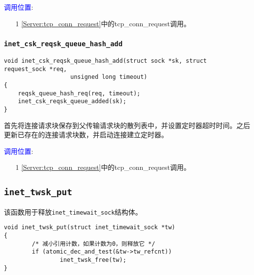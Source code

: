         \textcolor{blue}{调用位置}:

            \begin{enumerate}
                \item[1]        \ref{Server:tcp_conn_request}中的tcp\_conn\_request调用。
            \end{enumerate}

        \subsubsection{\texttt{inet_csk_reqsk_queue_hash_add}}
            \label{INET:inet_csk_reqsk_queue_hash_add}
\begin{verbatim}
void inet_csk_reqsk_queue_hash_add(struct sock *sk, struct request_sock *req,
                   unsigned long timeout)
{
    reqsk_queue_hash_req(req, timeout);
    inet_csk_reqsk_queue_added(sk);
}
\end{verbatim}

        首先将连接请求块保存到父传输请求块的散列表中，并设置定时器超时时间。之后更新已存在的连接请求块数，并启动连接建立定时器。

        \textcolor{blue}{调用位置}:

            \begin{enumerate}
                \item[1]        \ref{Server:tcp_conn_request}中的tcp\_conn\_request调用。
            \end{enumerate}

    \subsection{\texttt{inet_twsk_put}}
该函数用于释放\texttt{inet_timewait_sock}结构体。
\begin{verbatim}
void inet_twsk_put(struct inet_timewait_sock *tw)
{
        /* 减小引用计数，如果计数为0，则释放它 */
        if (atomic_dec_and_test(&tw->tw_refcnt))
                inet_twsk_free(tw);
}
\end{verbatim}


    
